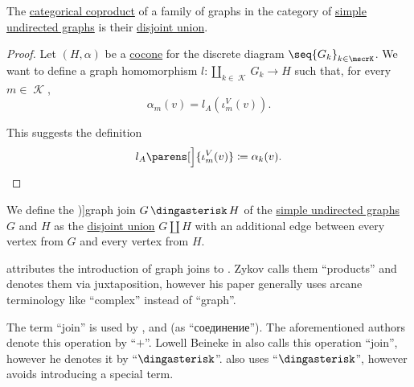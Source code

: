 \begin{proposition}\label{thm:undirected_graph_coproduct}
  The \hyperref[def:discrete_category_limits]{categorical coproduct} of a family of graphs in the category of \hyperref[def:undirected_graph]{simple undirected graphs} is their \hyperref[def:graph_disjoint_union]{disjoint union}.
\end{proposition}
\begin{proof}
  Let \( (H, \alpha) \) be a \hyperref[def:category_of_cones/cocone]{cocone} for the discrete diagram \( \seq{ G_k }_{k \in \mscrK} \). We want to define a graph homomorphism \( l: \coprod_{k \in \mscrK} G_k \to H \) such that, for every \( m \in \mscrK \),
  \begin{equation*}
    \alpha_m(v) = l_A(\iota^V_m(v)).
  \end{equation*}

  This suggests the definition
  \begin{equation*}
    l_A\parens[\Big]{ \iota^V_m(v) } \coloneqq \alpha_k(v).
  \end{equation*}
\end{proof}

\begin{definition}\label{def:graph_join}
  We define the \term[ru=соединение (графов) (\cite[265]{Новиков2013})]{graph join} \( G \Ast H \) of the \hyperref[def:undirected_graph]{simple undirected graphs} \( G \) and \( H \) as the \hyperref[def:graph_disjoint_union]{disjoint union} \( G \coprod H \) with an additional edge between every vertex from \( G \) and every vertex from \( H \).
\end{definition}
\begin{comments}
  \item {} attributes the introduction of graph joins to \cite[164]{Зыков1949}. Zykov calls them \enquote{products} and denotes them via juxtaposition, however his paper generally uses arcane terminology like \enquote{complex} instead of \enquote{graph}.

  The term \enquote{join} is used by ,  and  (as \enquote{соединение}). The aforementioned authors denote this operation by \enquote{\( + \)}. Lowell Beineke in \cite[547]{Rosen1999} also calls this operation \enquote{join}, however he denotes it by \enquote{\( \Ast \)}.  also uses \enquote{\( \Ast \)}, however avoids introducing a special term.
\end{comments}

